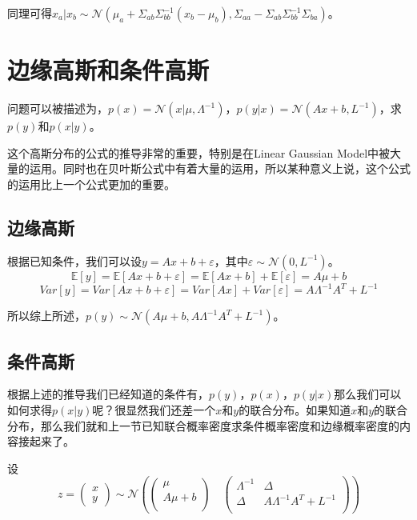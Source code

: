 \documentclass[a4paper]{article}
\begin{document}
同理可得$x_a|x_b\sim \mathcal{N}(\mu_a+\Sigma_{ab}\Sigma_{bb}^{-1}(x_b-\mu_b), \Sigma_{aa}-\Sigma_{ab}\Sigma_{bb}^{-1}\Sigma_{ba})$。

\section{边缘高斯和条件高斯}
问题可以被描述为，$p(x)=\mathcal{N}(x|\mu,\Lambda^{-1})$，$p(y|x)=\mathcal{N}(Ax+b,L^{-1})$，求$p(y)$和$p(x|y)$。

这个高斯分布的公式的推导非常的重要，特别是在Linear Gaussian Model中被大量的运用。同时也在贝叶斯公式中有着大量的运用，所以某种意义上说，这个公式的运用比上一个公式更加的重要。

\subsection{边缘高斯}

根据已知条件，我们可以设$y=Ax+b+\varepsilon$，其中$\varepsilon\sim\mathcal{N}(0,L^{-1})$。
\begin{equation}
    \mathbb{E}[y]=\mathbb{E}[Ax+b+\varepsilon] = \mathbb{E}[Ax+b]+ \mathbb{E}[\varepsilon] = A\mu +b
\end{equation}
\begin{equation}
    Var[y] = Var[Ax+b+\varepsilon] = Var[Ax]+Var[\varepsilon]=A\Lambda^{-1}A^T +L^{-1}
\end{equation}

所以综上所述，$p(y)\sim\mathcal{N}(A\mu +b, A\Lambda^{-1}A^T +L^{-1})$。

\subsection{条件高斯}
根据上述的推导我们已经知道的条件有，$p(y)$，$p(x)$，$p(y|x)$那么我们可以如何求得$p(x|y)$呢？很显然我们还差一个$x$和$y$的联合分布。如果知道$x$和$y$的联合分布，那么我们就和上一节已知联合概率密度求条件概率密度和边缘概率密度的内容接起来了。

设
\begin{equation}
    z=
    \begin{pmatrix}
        x \\ 
        y
    \end{pmatrix} \sim
    \mathcal{N}
    \left(
    \begin{pmatrix}
        \mu \\
        A\mu + b \\
    \end{pmatrix}
    \quad
    \begin{pmatrix}
        \Lambda^{-1} & \Delta \\
        \Delta   & A\Lambda^{-1}A^T +L^{-1} \\
    \end{pmatrix}
    \right)
\end{equation}
\end{document}

